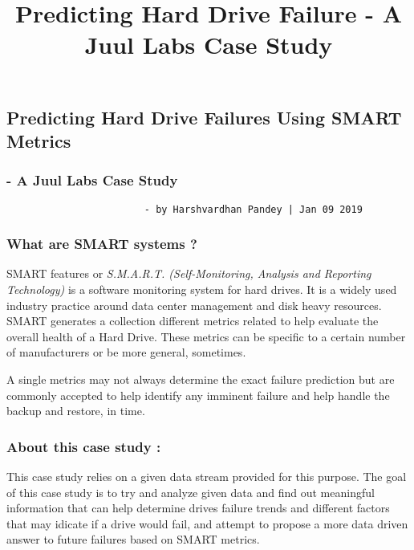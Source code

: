 \documentclass[11pt]{article}
\title{Predicting Hard Drive Failure - A Juul Labs Case Study}
\begin{document}
    
    
    \maketitle
    
    

    
    \subsection{Predicting Hard Drive Failures Using SMART
Metrics}\label{predicting-hard-drive-failures-using-smart-metrics}

\subsubsection{\texorpdfstring{ - A Juul Labs Case
Study}{   - A Juul Labs Case Study}}\label{a-juul-labs-case-study}

\begin{verbatim}
                        - by Harshvardhan Pandey | Jan 09 2019
\end{verbatim}

    \subsubsection{What are SMART systems ?}\label{what-are-smart-systems}

SMART features or \emph{S.M.A.R.T. (Self-Monitoring, Analysis and
Reporting Technology)} is a software monitoring system for hard drives.
It is a widely used industry practice around data center management and
disk heavy resources. SMART generates a collection different metrics
related to help evaluate the overall health of a Hard Drive. These
metrics can be specific to a certain number of manufacturers or be more
general, sometimes.

A single metrics may not always determine the exact failure prediction
but are commonly accepted to help identify any imminent failure and help
handle the backup and restore, in time.

\subsubsection{About this case study :}\label{about-this-case-study}

This case study relies on a given data stream provided for this purpose.
The goal of this case study is to try and analyze given data and find
out meaningful information that can help determine drives failure trends
and different factors that may idicate if a drive would fail, and
attempt to propose a more data driven answer to future failures based on
SMART metrics.
\end{document}
